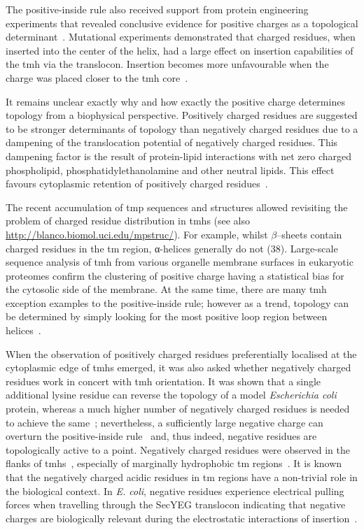 The positive-inside rule also received support from protein engineering experiments that revealed conclusive evidence for positive charges as a topological determinant~\cite{VonHeijne1989, Beltzer1991, Kida2006, Nilsson1990}. Mutational experiments demonstrated that charged residues, when inserted into the center of the helix, had a large effect on insertion capabilities of the \gls{tmh} via the translocon. Insertion becomes more unfavourable when the charge was placed closer to the \gls{tmh} core~\cite{Hessa2005}.

It remains unclear exactly why and how exactly the positive charge determines topology from a biophysical perspective. Positively charged residues are suggested to be stronger determinants of topology than negatively charged residues due to a dampening of the translocation potential of negatively charged residues. This dampening factor is the result of protein-lipid interactions with net zero charged phospholipid, phosphatidylethanolamine and other neutral lipids. This effect favours cytoplasmic retention of positively charged residues~\cite{Bogdanov2014}.

The recent accumulation of \gls{tmp} sequences and structures allowed revisiting the problem of charged residue distribution in \gls{tmh}s (see also \url{http://blanco.biomol.uci.edu/mpstruc/}). For example, whilst \(\beta\)--sheets contain charged residues in the \gls{tm} region, α-helices generally do not (38). Large-scale sequence analysis of \gls{tmh} from various organelle membrane surfaces in eukaryotic proteomes confirm the clustering of positive charge having a statistical bias for the cytosolic side of the membrane. At the same time, there are many \gls{tmh} exception examples to the positive-inside rule; however as a trend, topology can be determined by simply looking for the most positive loop region between helices~\cite{Sharpe2010, Baeza-Delgado2013}.

When the observation of positively charged residues preferentially localised at the cytoplasmic edge of \gls{tmh}s emerged, it was also asked whether negatively charged residues work in concert with \gls{tmh} orientation. It was shown that a single additional lysine residue can reverse the topology of a model \textit{Escherichia coli} protein, whereas a much higher number of negatively charged residues is needed to achieve the same~\cite{Nilsson1990}; nevertheless, a sufficiently large negative charge can overturn the positive-inside rule~\cite{Andersson1993, Kim1994} and, thus indeed, negative residues are topologically active to a point. Negatively charged residues were observed in the flanks of \gls{tmh}s~\cite{Baeza-Delgado2013}, especially of marginally hydrophobic \gls{tm} regions~\cite{Delgado-Partin1998}. It is known that the negatively charged acidic residues in \gls{tm} regions have a non-trivial role in the biological context. In \textit{E. coli}, negative residues experience electrical pulling forces when travelling through the SecYEG translocon indicating that negative charges are biologically relevant during the electrostatic interactions of insertion~\cite{Ismail2012, Ismail2015}.

